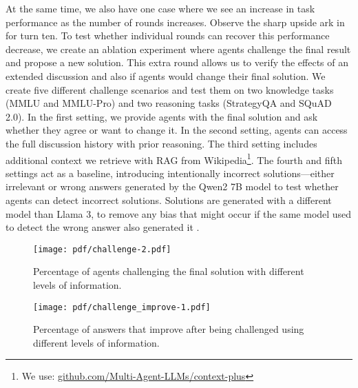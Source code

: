 At the same time, we also have one case where we see an increase in task performance as the number of rounds increases. Observe the sharp upside ark in  for turn ten.
To test whether individual rounds can recover this performance decrease, we create an ablation experiment where agents challenge the final result and propose a new solution.
This extra round allows us to verify the effects of an extended discussion and also if agents would change their final solution.
We create five different challenge scenarios and test them on two knowledge tasks (MMLU and MMLU-Pro) and two reasoning tasks (StrategyQA and SQuAD 2.0).
In the first setting, we provide agents with the final solution and ask whether they agree or want to change it. 
In the second setting, agents can access the full discussion history with prior reasoning. 
The third setting includes additional context we retrieve with RAG from Wikipedia\footnote{We use: \href{https://github.com/Multi-Agent-LLMs/context-plus}{github.com/Multi-Agent-LLMs/context-plus}}.
The fourth and fifth settings act as a baseline, introducing intentionally incorrect solutions---either irrelevant or wrong answers generated by the Qwen2 7B \citep{yang_qwen2_2024} model to test whether agents can detect incorrect solutions. 
Solutions are generated with a different model than Llama 3, to remove any bias that might occur if the same model used to detect the wrong answer also generated it \cite{wahle_are_2021}.


\begin{figure}[t]
    \centering
    \texttt{[image: pdf/challenge-2.pdf]}
    \caption{Percentage of agents challenging the final solution with different levels of information. %
  }
    \label{fig:challenge}
\end{figure}

\begin{figure}[t]
    \centering
    \texttt{[image: pdf/challenge\_improve-1.pdf]}
    \caption{Percentage of answers that improve after being challenged using different levels of information. %
    \vspace{-0.3cm}}
    \label{fig:challenge_improve}
\end{figure}

